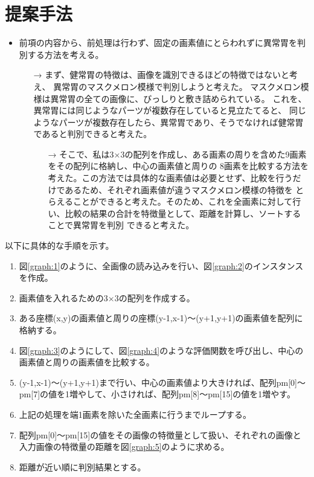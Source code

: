 \section{提案手法}
\begin{itemize}
  \item 前項の内容から、前処理は行わず、固定の画素値にとらわれずに異常胃を判別する方法を考える。
  \begin{itemize}
    \item[→] まず、健常胃の特徴は、画像を識別できるほどの特徴ではないと考え、
    異常胃のマスクメロン模様で判別しようと考えた。
    マスクメロン模様は異常胃の全ての画像に、びっしりと敷き詰められている。
    これを、異常胃には同じようなパーツが複数存在していると見立たてると、
    同じようなパーツが複数存在したら、異常胃であり、そうでなければ健常胃であると判別できると考えた。
    \begin{itemize}
      \item[→] そこで、私は3×3の配列を作成し、ある画素の周りを含めた9画素をその配列に格納し、中心の画素値と周りの
      8画素を比較する方法を考えた。この方法では具体的な画素値は必要とせず、比較を行うだけであるため、それぞれ画素値が違うマスクメロン模様の特徴を
      とらえることができると考えた。そのため、これを全画素に対して行い、比較の結果の合計を特徴量として、距離を計算し、ソートすることで異常胃を判別
      できると考えた。
    \end{itemize}
  \end{itemize}
\end{itemize}
以下に具体的な手順を示す。

\begin{enumerate}
  \item 図\ref{graph:1}のように、全画像の読み込みを行い、図\ref{graph:2}のインスタンスを作成。
  \item 画素値を入れるための3×3の配列を作成する。
  \item ある座標(x,y)の画素値と周りの座標(y-1,x-1)～(y+1,y+1)の画素値を配列に格納する。
  \item 図\ref{graph:3}のようにして、図\ref{graph:4}のような評価関数を呼び出し、中心の画素値と周りの画素値を比較する。
  \item (y-1,x-1)～(y+1,y+1)まで行い、中心の画素値より大きければ、配列pm[0]～pm[7]の値を1増やして、小さければ、配列pm[8]～pm[15]の値を1増やす。
  \item 上記の処理を端1画素を除いた全画素に行うまでループする。
  \item 配列pm[0]～pm[15]の値をその画像の特徴量として扱い、それぞれの画像と入力画像の特徴量の距離を図\ref{graph:5}のように求める。
  \item 距離が近い順に判別結果とする。
\end{enumerate}


